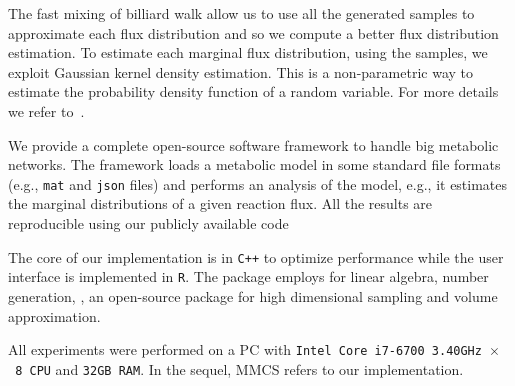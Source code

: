    The fast mixing of billiard walk allow us to use all the generated samples to
   approximate each flux distribution and so we compute a better flux distribution
   estimation. To estimate each marginal flux distribution, using the samples, we
   exploit Gaussian kernel density estimation. This is a non-parametric way to
   estimate the probability density function of a random variable. For more details
   we refer to~\cite{Jones96}.

   We provide a complete open-source software framework to handle big metabolic
   networks. 
   The framework loads a metabolic model in some standard file formats
   (e.g., \texttt{mat} and \texttt{json} files) and performs an analysis of the model, e.g., it
   estimates the marginal distributions of a given reaction flux. All the results
   are reproducible using our publicly available code


   The core of our implementation is in \texttt{C++} to optimize performance while the
   user interface is implemented in \texttt{R}. The package employs
   \cite{eigenweb} for linear algebra, 
   number generation, 
   \cite{chalkis2020volesti}, an open-source package for high dimensional sampling and volume approximation.

   All experiments were performed on a PC with \texttt{Intel Core i7-6700 3.40GHz $\times$\ 8 CPU} and \texttt{32GB RAM}.
   In the sequel, MMCS refers to our implementation.

